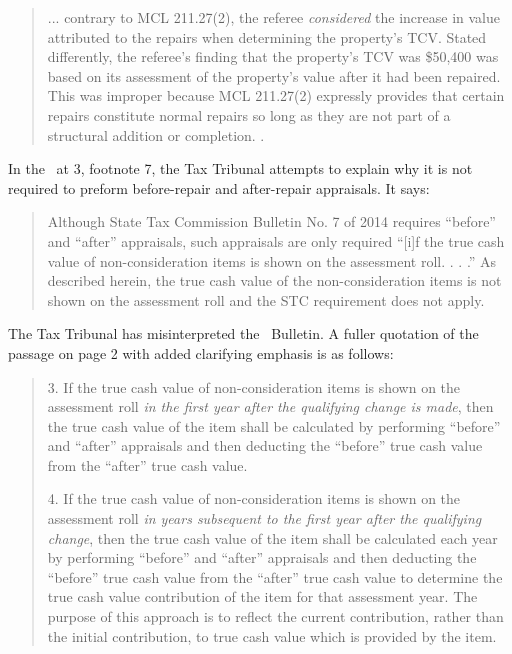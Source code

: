 \documentclass[12pt,\documentclassflag]{michiganCourtOfAppealsBrief}
\begin{document}
\begin{quote}
... contrary to MCL 211.27(2), the referee \textit{considered} the increase in value attributed to the repairs when determining the property's TCV. Stated differently, the referee's finding that the property's TCV was \$50,400 was based on its assessment of the property's value after it had been repaired. This was improper because MCL 211.27(2) expressly provides that certain repairs constitute normal repairs so long as they are not part of a structural addition or completion. .
\end{quote}

In the \orderDenying\ at 3, footnote 7, the Tax Tribunal attempts to explain why it is not required to preform before-repair and after-repair appraisals. It says: 

\begin{quote}
	Although State Tax Commission Bulletin No. 7 of 2014 requires ``before'' and ``after'' appraisals, such appraisals are only required ``[i]f the true cash value of non-consideration items is shown on the assessment roll. . . .'' As described herein, the true cash value of the non-consideration items is not shown on the assessment roll and the STC requirement does not apply.
\end{quote}

The Tax Tribunal has misinterpreted the \STC\ Bulletin. A fuller quotation of the passage on page 2 with added clarifying emphasis is as follows:

\begin{quotation}
3. If the true cash value of non-consideration items is shown on the assessment roll \textit{in the first year after the qualifying change is made}, then the true cash value of the item shall be calculated by performing ``before'' and ``after'' appraisals and then deducting the ``before'' true cash value from the ``after'' true cash value.

4. If the true cash value of non-consideration items is shown on the assessment roll \textit{in years subsequent to the first year after the qualifying change}, then the true cash value of the item shall be calculated each year by performing ``before'' and ``after'' appraisals and then deducting the ``before'' true cash value from the ``after'' true cash value to determine the true cash value contribution of the item for that assessment year. The purpose of this approach is to reflect the current contribution, rather than the initial contribution, to true cash value which is provided by the item.
\end{quotation}
\end{document}
